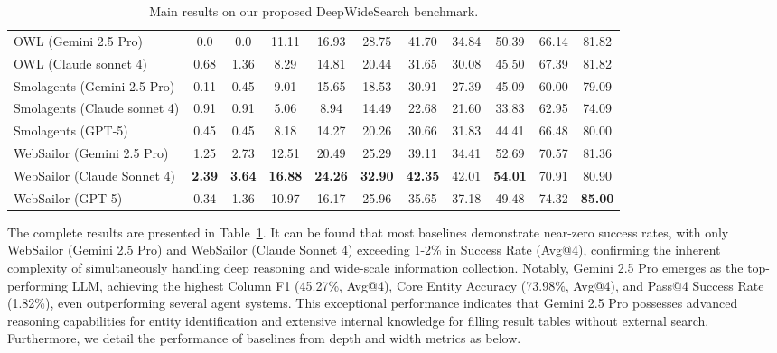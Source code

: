 \documentclass[11pt, letterpaper, logo, onecolumn, copyright, numbering]{paper_improved}
\begin{document}
\begin{table}[t]
{\begin{tabular}{l|cc cc cc | cc cc}
\midrule
OWL (Gemini 2.5 Pro) &0.0&0.0&11.11&16.93&28.75&41.70&34.84&50.39&66.14&81.82\\
OWL (Claude sonnet 4) &0.68&1.36&8.29&14.81&20.44&31.65&30.08&45.50&67.39&81.82\\
Smolagents (Gemini 2.5 Pro) &0.11&0.45&9.01&15.65&18.53&30.91&27.39&45.09&60.00&79.09\\
Smolagents (Claude sonnet 4) &0.91&0.91&5.06&8.94&14.49&22.68&21.60&33.83&62.95&74.09\\
Smolagents (GPT-5) &0.45&0.45&8.18&14.27&20.26&30.66&31.83&44.41&66.48&80.00\\
WebSailor (Gemini 2.5 Pro) &1.25&2.73&12.51&20.49&25.29&39.11&34.41&52.69&70.57&81.36\\
WebSailor (Claude Sonnet 4) &\textbf{2.39}&\textbf{3.64}&\textbf{16.88}&\textbf{24.26}&\textbf{32.90}&\textbf{42.35}&42.01&\textbf{54.01}&70.91&80.90\\
WebSailor (GPT-5) &0.34&1.36&10.97&16.17&25.96&35.65&37.18&49.48&74.32&\textbf{85.00}\\
\bottomrule
\end{tabular}
}
\caption{Main results on our proposed DeepWideSearch benchmark.}
\label{tab:main_results}
\end{table}

The complete results are presented in Table~\ref{tab:main_results}. It can be found that most baselines demonstrate near-zero success rates, with only WebSailor (Gemini 2.5 Pro) and WebSailor (Claude Sonnet 4) exceeding 1-2\% in Success Rate (Avg@4), confirming the inherent complexity of simultaneously handling deep reasoning and wide-scale information collection. Notably, Gemini 2.5 Pro emerges as the top-performing LLM, achieving the highest Column F1 (45.27\%, Avg@4), Core Entity Accuracy (73.98\%, Avg@4), and Pass@4 Success Rate (1.82\%), even outperforming several agent systems. This exceptional performance indicates that Gemini 2.5 Pro possesses advanced reasoning capabilities for entity identification and extensive internal knowledge for filling result tables without external search.
Furthermore, we detail the performance of baselines from depth and width metrics as below.


\end{document}
